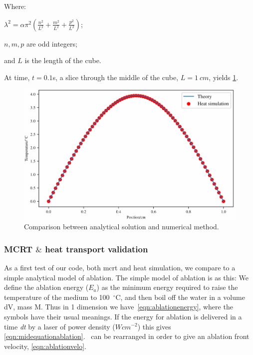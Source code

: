 \noindent Where:

	\indent $\lambda^2=\alpha\pi^2(\tfrac{n^2}{L^2}+\tfrac{m^2}{L^2}+\tfrac{p^2}{L^2})$;
	
	\indent $n,m,p$ are odd integers;
	
	\indent and $L$ is the length of the cube.
	
	\medskip
	
At time, $t=0.1$s, a slice through the middle of the cube, $L=1~cm$,  yields \cref{fig:validation-heat}.

\begin{figure}	
\vspace{-10pt}
	\centering
	\includegraphics[width=\columnwidth]{./ablation/images/validation.pdf}
	\caption{Comparison between analytical solution and numerical method.}
	\label{fig:validation-heat}
	\vspace{-10pt}
\end{figure}	

\subsubsection{MCRT $\&$ heat transport validation}

As a first test of our code, both \gls{mcrt} and heat simulation, we compare to a simple analytical model of ablation. The simple model of ablation is as this: We define the ablation energy ($E_a$) as the minimum energy required to raise the temperature of the medium to 100~$^{\circ}$C, and then boil off the water in a volume dV, mass M. Thus in 1 dimension we have~\cref{eqn:ablationenergy}, where the symbols have their usual meanings. If the energy for ablation is delivered in a time \textit{dt} by a laser of power density ($Wcm^{-2}$) this gives \cref{eqn:midequationablation}.~ can be rearranged in order to give an ablation front velocity, \cref{eqn:ablationvelo}.


